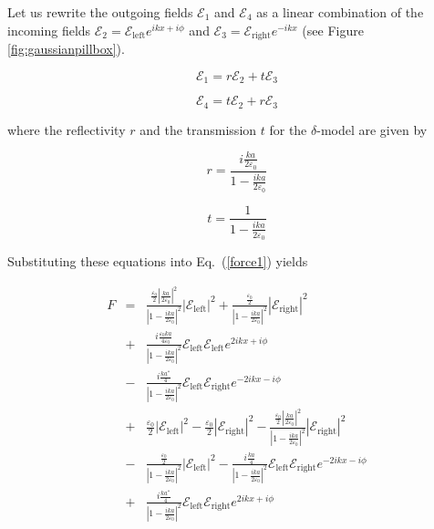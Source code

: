 \documentclass[twocolumn,english,pra,aps,superscriptaddress,floatfix]{revtex4-1}
\begin{document}
Let us rewrite the outgoing fields $\mathcal{E}_{1}$ and $\mathcal{E}_{4}$ as a linear combination of the incoming fields $\mathcal{E}_{2}=\mathcal{E}_{\mathrm{left}}e^{ikx+i\phi}$ 
and $\mathcal{E}_{3}=\mathcal{E}_{\mathrm{right}}e^{-ikx}$ (see Figure \ref{fig:gaussianpillbox}).

\begin{equation}
\mathcal{E}_{1}=r\mathcal{E}_{2}+t\mathcal{E}_{3}
\label{E1}
\end{equation}


\begin{equation}
\mathcal{E}_{4}=t\mathcal{E}_{2}+r\mathcal{E}_{3}
\label{E4}
\end{equation}

where the reflectivity $r$ and the transmission $t$ for the $\delta$-model are given by \cite{us}

\begin{equation}
r=\frac{i\frac{k a}{2\varepsilon_{0}}}{1-\frac{ik a}{2\varepsilon_{0}}}
\label{reflectivity}
\end{equation}


\begin{equation}
t=\frac{1}{1-\frac{ik a}{2\varepsilon_{0}}}
\label{transmission}
\end{equation}

Substituting these equations into Eq.\ (\ref{force1}) yields

\begin{eqnarray}
F&=&\frac{\frac{\varepsilon_{0}}{2}\left|\frac{k a}{2\varepsilon_{0}}\right|^{2}}{\left|1-\frac{ika}{2\varepsilon_{0}}\right|^{2}}\left|\mathcal{E}_{\mathrm{left}}\right|^{2}+\frac{\frac{\varepsilon_{0}}{2}}{\left|1-\frac{ika}{2\varepsilon_{0}}\right|^{2}}\left|\mathcal{E}_{\mathrm{right}}\right|^{2} \nonumber \\
&+&\frac{i\frac{\varepsilon_{0}ka}{4\varepsilon_{0}}}{\left|1-\frac{ika}{2\varepsilon_{0}}\right|^{2}}\mathcal{E}_{\mathrm{left}}\mathcal{E}_{\mathrm{left}}e^{2ikx+i\phi}\nonumber \\
&-&\frac{i\frac{ka^{*}}{4}}{\left|1-\frac{ika}{2\varepsilon_{0}}\right|^{2}}\mathcal{E}_{\mathrm{left}}\mathcal{E}_{\mathrm{right}}e^{-2ikx-i\phi} \nonumber \\
&+&\frac{\varepsilon_{0}}{2}\left|\mathcal{E}_{\mathrm{left}}\right|^{2}-\frac{\varepsilon_{0}}{2}\left|\mathcal{E}_{\mathrm{right}}\right|^{2}-\frac{\frac{\varepsilon_{0}}{2}\left|\frac{ka}{2\varepsilon_{0}}\right|^{2}}{\left|1-\frac{ika}{2\varepsilon_{0}}\right|^{2}}\left|\mathcal{E}_{\mathrm{right}}\right|^{2} \nonumber \\
&-&\frac{\frac{\varepsilon_{0}}{2}}{\left|1-\frac{ika}{2\varepsilon_{0}}\right|^{2}}\left|\mathcal{E}_{\mathrm{left}}\right|^{2}-\frac{i\frac{ka}{4}}{\left|1-\frac{ika}{2\varepsilon_{0}}\right|^{2}}\mathcal{E}_{\mathrm{left}}\mathcal{E}_{\mathrm{right}}e^{-2ikx-i\phi} \nonumber \\
&+&\frac{i\frac{ka^{*}}{4}}{\left|1-\frac{ika}{2\varepsilon_{0}}\right|^{2}}\mathcal{E}_{\mathrm{left}}\mathcal{E}_{\mathrm{right}}e^{2ikx+i\phi}
\label{f1}
\end{eqnarray}
\end{document}
